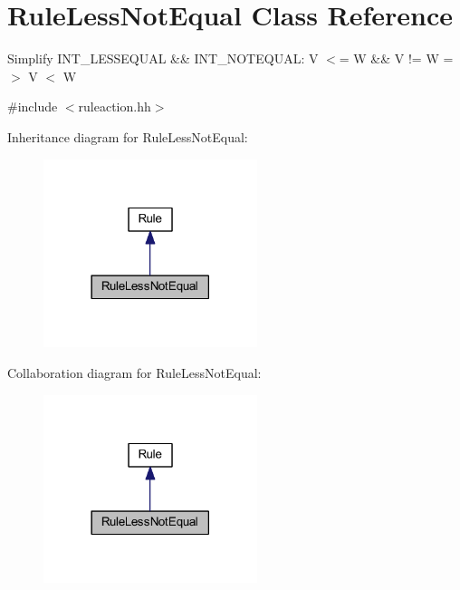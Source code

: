 \hypertarget{class_rule_less_not_equal}{}\section{Rule\+Less\+Not\+Equal Class Reference}
\label{class_rule_less_not_equal}


Simplify I\+N\+T\+\_\+\+L\+E\+S\+S\+E\+Q\+U\+AL \&\& I\+N\+T\+\_\+\+N\+O\+T\+E\+Q\+U\+AL\+: {\ttfamily V $<$= W \&\& V != W =$>$ V $<$ W}  




{\ttfamily \#include $<$ruleaction.\+hh$>$}



Inheritance diagram for Rule\+Less\+Not\+Equal\+:
\nopagebreak
\begin{figure}[H]
\begin{center}
\leavevmode
\includegraphics[width=177pt]{class_rule_less_not_equal__inherit__graph}
\end{center}
\end{figure}


Collaboration diagram for Rule\+Less\+Not\+Equal\+:
\nopagebreak
\begin{figure}[H]
\begin{center}
\leavevmode
\includegraphics[width=177pt]{class_rule_less_not_equal__coll__graph}
\end{center}
\end{figure}

